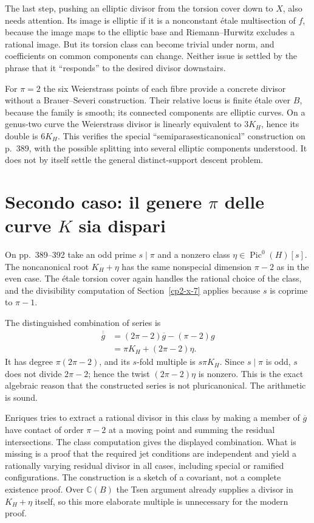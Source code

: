 The last step, pushing an elliptic divisor from the torsion cover down to $X$, also needs attention. Its image is elliptic if it is a nonconstant étale multisection of $f$, because the image maps to the elliptic base and Riemann--Hurwitz excludes a rational image. But its torsion class can become trivial under norm, and coefficients on common components can change. Neither issue is settled by the phrase that it ``responds'' to the desired divisor downstairs.

For $\pi=2$ the six Weierstrass points of each fibre provide a concrete divisor without a Brauer--Severi construction. Their relative locus is finite étale over $B$, because the family is smooth; its connected components are elliptic curves. On a genus-two curve the Weierstrass divisor is linearly equivalent to $3K_H$, hence its double is $6K_H$. This verifies the special ``semiparasesticanonical'' construction on p.~389, with the possible splitting into several elliptic components understood. It does not by itself settle the general distinct-support descent problem.

\section{Secondo caso: il genere \texorpdfstring{$\pi$}{π} delle curve \texorpdfstring{$K$}{K} sia dispari}
\label{cp2-x-8}

On pp.~389--392 take an odd prime $s\mid\pi$ and a nonzero class $\eta\in\operatorname{Pic}^0(H)[s]$. The noncanonical root $K_H+\eta$ has the same nonspecial dimension $\pi-2$ as in the even case. The étale torsion cover again handles the rational choice of the class, and the divisibility computation of Section~\ref{cp2-x-7} applies because $s$ is coprime to $\pi-1$.

The distinguished combination of series is
\begin{align*}
 \overline{\overline g}
  &=(2\pi-2)\overline g-(\pi-2)g\\
  &=\pi K_H+(2\pi-2)\eta.
\end{align*}
It has degree $\pi(2\pi-2)$, and its $s$-fold multiple is $s\pi K_H$. Since $s\mid\pi$ is odd, $s$ does not divide $2\pi-2$; hence the twist $(2\pi-2)\eta$ is nonzero. This is the exact algebraic reason that the constructed series is not pluricanonical. The arithmetic is sound.

Enriques tries to extract a rational divisor in this class by making a member of $\overline g$ have contact of order $\pi-2$ at a moving point and summing the residual intersections. The class computation gives the displayed combination. What is missing is a proof that the required jet conditions are independent and yield a rationally varying residual divisor in all cases, including special or ramified configurations. The construction is a sketch of a covariant, not a complete existence proof. Over $\mathbb C(B)$ the Tsen argument already supplies a divisor in $K_H+\eta$ itself, so this more elaborate multiple is unnecessary for the modern proof.

